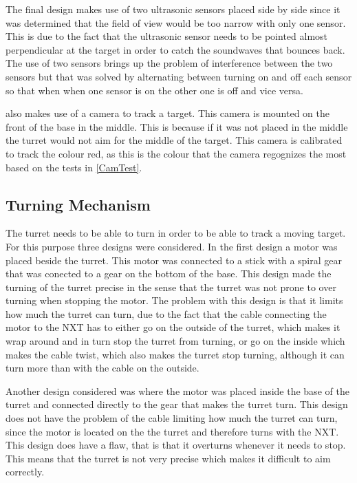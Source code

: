 The final design makes use of two ultrasonic sensors placed side by side since
it was determined that the field of view would be too narrow with only one
sensor. This is due to the fact that the ultrasonic sensor needs to be pointed
almost perpendicular at the target in order to catch the soundwaves that bounces
back. The use of two sensors brings up the problem of interference between the
two sensors but that was solved by alternating between turning on and off each
sensor so that when when one sensor is on the other one is off and vice
versa.\nl

\name also makes use of a camera to track a target. This camera is mounted on
the front of the base in the middle. This is because if it was not placed in the
middle the turret would not aim for the middle of the target. This camera is
calibrated to track the colour red, as this is the colour that the camera
regognizes the most based on the tests in \autoref{CamTest}.

\subsection{Turning Mechanism}
The turret needs to be able to turn in order to be able to track a moving
target. For this purpose three designs were considered. In the first design a
motor was placed beside the turret. This motor was connected to a stick with a
spiral gear that was conected to a gear on the bottom of the base. This design
made the turning of the turret precise in the sense that the turret was not
prone to over turning when stopping the motor. The problem with this design is
that it limits how much the turret can turn, due to the fact that the cable
connecting the motor to the NXT has to either go on the outside of the turret,
which makes it wrap around and in turn stop the turret from turning, or go on
the inside which makes the cable twist, which also makes the turret stop
turning, although it can turn more than with the cable on the outside.\nl

Another design considered was where the motor was placed inside the base of the
turret and connected directly to the gear that makes the turret turn. This
design does not have the problem of the cable limiting how much the turret can
turn, since the motor is located on the the turret and therefore turns with the
NXT. This design does have a flaw, that is that it overturns whenever it needs
to stop. This means that the turret is not very precise which makes it difficult to
aim correctly.\nl

